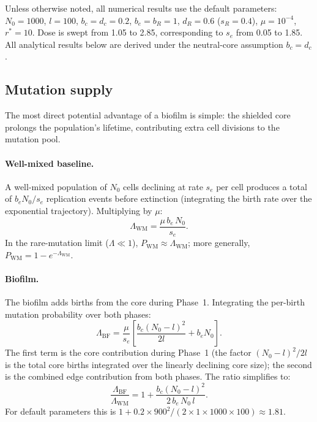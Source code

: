 \documentclass[12pt]{article}
\begin{document}
Unless otherwise noted, all numerical results use the default parameters:
$N_0 = 1000$, $l = 100$, $b_c = d_c = 0.2$, $b_e = b_R = 1$, $d_R = 0.6$
($s_R = 0.4$), $\mu = 10^{-4}$, $r^* = 10$. Dose is swept from 1.05 to 2.85,
corresponding to $s_e$ from 0.05 to 1.85. All analytical results below are
derived under the neutral-core assumption $b_c = d_c$.


\subsection{Mutation supply}
\label{sec:lambda}

The most direct potential advantage of a biofilm is simple: the shielded
core prolongs the population's lifetime, contributing extra cell divisions
to the mutation pool.

\paragraph{Well-mixed baseline.}
A well-mixed population of $N_0$ cells declining at rate $s_e$ per cell
produces a total of $b_e N_0 / s_e$ replication events before extinction
(integrating the birth rate over the exponential trajectory). Multiplying
by $\mu$:
\begin{equation}
    \Lambda_{\text{WM}} = \frac{\mu\, b_e\, N_0}{s_e}.
    \label{eq:lambda_wm}
\end{equation}
In the rare-mutation limit ($\Lambda \ll 1$), $P_{\text{WM}} \approx \Lambda_{\text{WM}}$;
more generally, $P_{\text{WM}} = 1 - e^{-\Lambda_{\text{WM}}}$.

\paragraph{Biofilm.}
The biofilm adds births from the core during Phase~1. Integrating the
per-birth mutation probability over both phases:
\begin{equation}
    \Lambda_{\text{BF}} = \frac{\mu}{s_e}\!\left[
        \frac{b_c (N_0 - l)^2}{2l} + b_e N_0
    \right].
    \label{eq:lambda_bf}
\end{equation}
The first term is the core contribution during Phase~1 (the factor
$(N_0-l)^2/2l$ is the total core births integrated over the linearly
declining core size); the second is the combined edge contribution
from both phases. The ratio simplifies to:
\begin{equation}
    \frac{\Lambda_{\text{BF}}}{\Lambda_{\text{WM}}}
    = 1 + \frac{b_c (N_0 - l)^2}{2\, b_e\, N_0\, l}.
    \label{eq:lambda_ratio}
\end{equation}
For default parameters this is $1 + 0.2 \times 900^2 / (2 \times 1 \times
1000 \times 100) \approx 1.81$.
\end{document}
